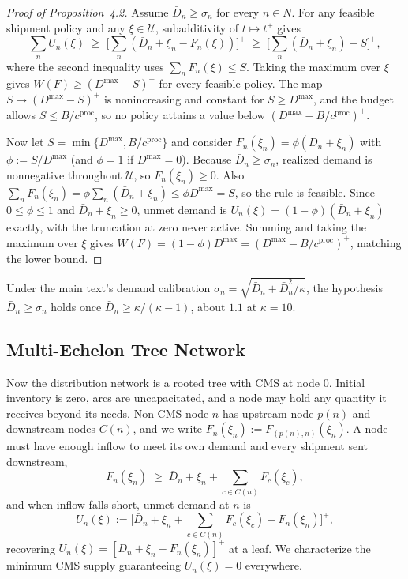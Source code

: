 \documentclass[11pt]{article}
\begin{document}
\begin{proof}[Proof of Proposition~4.2]
Assume $\bar D_n\ge\sigma_n$ for every $n\in N$.
For any feasible shipment policy and any $\xi\in\mathcal{U}$, subadditivity of $t\mapsto t^+$ gives
\begin{equation}
\textstyle\sum_n U_n(\xi) \;\ge\; \big[\sum_n(\bar D_n+\xi_n-F_n(\xi))\big]^+
\;\ge\; \big[\sum_n(\bar D_n+\xi_n) - S\big]^+,
\end{equation}
where the second inequality uses $\sum_n F_n(\xi)\le S$.
Taking the maximum over $\xi$ gives $W(F)\ge(D^{\max}-S)^+$ for every feasible policy.
The map $S\mapsto(D^{\max}-S)^+$ is nonincreasing and constant for $S\ge D^{\max}$, and the budget allows $S\le B/c^{\text{proc}}$, so no policy attains a value below $(D^{\max}-B/c^{\text{proc}})^+$.

Now let $S=\min\{D^{\max},B/c^{\text{proc}}\}$ and consider $F_n(\xi_n) = \phi(\bar D_n+\xi_n)$ with $\phi := S/D^{\max}$ (and $\phi=1$ if $D^{\max}=0$).
Because $\bar D_n\ge\sigma_n$, realized demand is nonnegative throughout $\mathcal{U}$, so $F_n(\xi_n)\ge0$.
Also $\sum_n F_n(\xi_n) = \phi\sum_n(\bar D_n+\xi_n)\le\phi D^{\max} = S$, so the rule is feasible.
Since $0\le\phi\le1$ and $\bar D_n+\xi_n\ge0$, unmet demand is $U_n(\xi) = (1-\phi)(\bar D_n+\xi_n)$ exactly, with the truncation at zero never active.
Summing and taking the maximum over $\xi$ gives $W(F) = (1-\phi)D^{\max} = (D^{\max}-B/c^{\text{proc}})^+$, matching the lower bound.
\end{proof}

Under the main text's demand calibration $\sigma_n=\sqrt{\bar D_n+\bar D_n^2/\kappa}$, the hypothesis $\bar D_n\ge\sigma_n$ holds once $\bar D_n\ge\kappa/(\kappa-1)$, about $1.1$ at $\kappa=10$.

\subsection{Multi-Echelon Tree Network}
\label{ec:exactness-tree}

Now the distribution network is a rooted tree with CMS at node $0$.
Initial inventory is zero, arcs are uncapacitated, and a node may hold any quantity it receives beyond its needs.
Non-CMS node $n$ has upstream node $p(n)$ and downstream nodes $C(n)$, and we write $F_n(\xi_n) := F_{(p(n),n)}(\xi_n)$.
A node must have enough inflow to meet its own demand and every shipment sent downstream,
\begin{equation}
F_n(\xi_n) \;\ge\; \bar D_n+\xi_n+\textstyle\sum_{c\in C(n)}F_c(\xi_c),
\label{eq:ec-flow}
\end{equation}
and when inflow falls short, unmet demand at $n$ is
\begin{equation}
U_n(\xi) := \Big[\bar D_n+\xi_n+\textstyle\sum_{c\in C(n)}F_c(\xi_c)-F_n(\xi_n)\Big]^+,
\label{eq:ec-unmet-tree}
\end{equation}
recovering $U_n(\xi)=[\bar D_n+\xi_n-F_n(\xi_n)]^+$ at a leaf.
We characterize the minimum CMS supply guaranteeing $U_n(\xi)=0$ everywhere.
\end{document}
